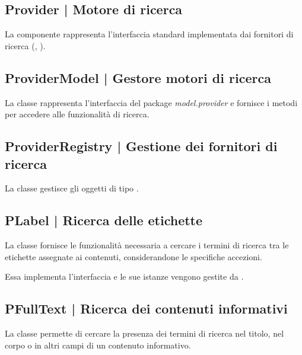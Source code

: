 \documentclass[10pt,a4paper,headinclude,footinclude,hidelinks]{scrreprt} %
\begin{document}
	\subsection[Provider]{Provider | Motore di ricerca}
	\label{sec:stage:design:sistema:model.search:search-provider}
	La componente rappresenta l'interfaccia standard implementata dai fornitori di ricerca (\textit{}, \textit{}).

	\subsection[ProviderModel]{ProviderModel | Gestore motori di ricerca}
	\label{sec:stage:design:sistema:model.search:provider-model}
	La classe \textit{} rappresenta l'interfaccia del package \textit{model.provider} e fornisce i metodi per accedere alle funzionalità di ricerca.

	\subsection[ProviderRegistry]{ProviderRegistry | Gestione dei fornitori di ricerca}
	\label{sec:stage:design:sistema:model.search:provider-registry}
	La classe \textit{} gestisce gli oggetti di tipo \textit{}.

	\subsection[PLabel]{PLabel | Ricerca delle etichette}
	\label{sec:stage:design:sistema:model.search:tag-provider}
	La classe \textit{} fornisce le funzionalità necessaria a cercare i termini di ricerca tra le etichette assegnate ai contenuti, considerandone le specifiche accezioni.

	Essa implementa l'interfaccia \textit{} e le sue istanze vengono gestite da \textit{}.

	\subsection[PFullText]{PFullText | Ricerca dei contenuti informativi}
	\label{sec:stage:design:sistema:model.search:full-text-provider}
	La classe \textit{} permette di cercare la presenza dei termini di ricerca nel titolo, nel corpo o in altri campi di un contenuto informativo.
\end{document}
